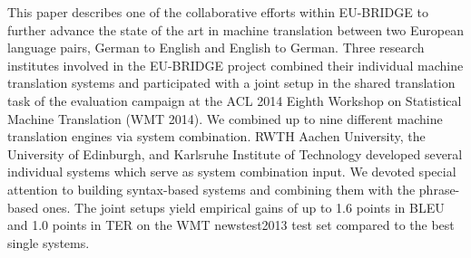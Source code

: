 This paper describes one of the collaborative efforts within EU-BRIDGE to further advance the state of the art in machine translation between two European language pairs, German to English and English to German. Three research institutes involved in the EU-BRIDGE project combined their individual machine translation systems and participated with a joint setup in the shared translation task of the evaluation campaign at the ACL 2014 Eighth Workshop on Statistical Machine Translation (WMT 2014). We combined up to nine different machine translation engines via system combination. RWTH Aachen University, the University of Edinburgh, and Karlsruhe Institute of Technology  developed several individual systems which serve as system combination input. We devoted special attention to building syntax-based systems and combining them with the phrase-based ones. The joint setups yield empirical gains of up to 1.6 points in BLEU and 1.0 points in TER on the WMT newstest2013 test set compared to the best single systems.
